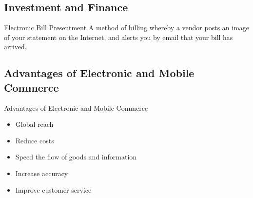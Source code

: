 \documentclass[\main/notes.tex]{subfiles}
\begin{document}
			\subsection{Investment and Finance}
				\begin{definition}{Electronic Bill Presentment}
					A method of billing whereby a vendor posts an image of your statement on the Internet, and alerts you by email that your bill has arrived.
				\end{definition}
			\subsection{Advantages of Electronic and Mobile Commerce}
				\begin{sidenote}{Advantages of Electronic and Mobile Commerce}
					\begin{itemize}[nosep]
						\item Global reach
						\item Reduce costs
						\item Speed the flow of goods and information
						\item Increase accuracy
						\item Improve customer service
					\end{itemize}
				\end{sidenote}

	\vbox{}
\end{document}
